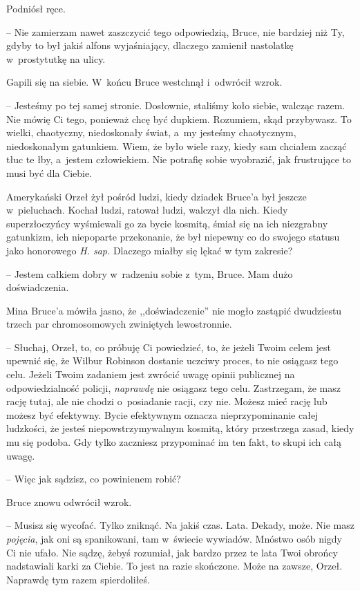 \documentclass[oneside,polish,11pt,sfheadings]{mwbk}
\begin{document}
Podniósł ręce. 

-- Nie zamierzam nawet zaszczycić tego odpowiedzią, Bruce,
nie bardziej niż Ty, gdyby to był jakiś alfons wyjaśniający, dlaczego
zamienił nastolatkę w~prostytutkę na ulicy.

Gapili się na siebie. W~końcu Bruce westchnął i~odwrócił wzrok.

-- Jesteśmy po tej samej stronie. Dosłownie, staliśmy koło siebie,
walcząc razem. Nie mówię Ci tego, ponieważ chcę być dupkiem. Rozumiem,
skąd przybywasz. To wielki, chaotyczny, niedoskonały świat, a~my
jesteśmy chaotycznym, niedoskonałym gatunkiem. Wiem, że było wiele razy,
kiedy sam chciałem zacząć tłuc te łby, a~jestem człowiekiem. Nie
potrafię sobie wyobrazić, jak frustrujące to musi być dla Ciebie.

Amerykański Orzeł żył pośród ludzi, kiedy dziadek Bruce'a był jeszcze w~pieluchach. Kochał ludzi, ratował ludzi, walczył dla nich. Kiedy
superzłoczyńcy wyśmiewali go za bycie kosmitą, śmiał się na ich
niezgrabny gatunkizm, ich niepoparte przekonanie, że był niepewny co do
swojego statusu jako honorowego \textit{H. sap.} Dlaczego miałby się lękać
w tym zakresie?

-- Jestem całkiem dobry w~radzeniu sobie z~tym, Bruce. Mam dużo
doświadczenia.

Mina Bruce'a mówiła jasno, że ,,doświadczenie'' nie mogło zastąpić
dwudziestu trzech par chromosomowych zwiniętych lewostronnie.

-- Słuchaj, Orzeł, to, co próbuję Ci powiedzieć, to, że jeżeli Twoim
celem jest upewnić się, że Wilbur Robinson dostanie uczciwy proces, to
nie osiągasz tego celu. Jeżeli Twoim zadaniem jest zwrócić uwagę opinii
publicznej na odpowiedzialność policji, \textit{naprawdę} nie osiągasz
tego celu. Zastrzegam, że masz rację tutaj, ale nie chodzi o~posiadanie
racji, czy nie. Możesz mieć rację lub możesz być efektywny. Bycie
efektywnym oznacza nieprzypominanie całej ludzkości, że jesteś
niepowstrzymywalnym kosmitą, który przestrzega zasad, kiedy mu się
podoba. Gdy tylko zaczniesz przypominać im ten fakt, to skupi ich całą
uwagę.

-- Więc jak sądzisz, co powinienem robić?

Bruce znowu odwrócił wzrok. 

-- Musisz się wycofać. Tylko zniknąć. Na
jakiś czas. Lata. Dekady, może. Nie masz \textit{pojęcia}, jak oni są
spanikowani, tam w~świecie wywiadów. Mnóstwo osób nigdy Ci nie ufało.
Nie sądzę, żebyś rozumiał, jak bardzo przez te lata Twoi obrońcy
nadstawiali karki za Ciebie. To jest na razie skończone. Może na zawsze,
Orzeł. Naprawdę tym razem spierdoliłeś.
\end{document}
